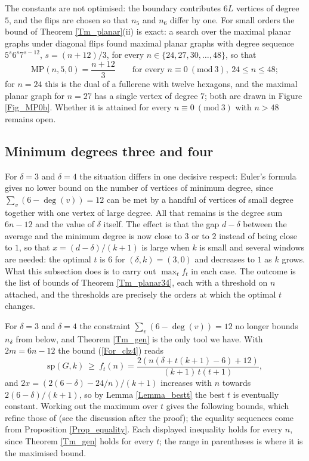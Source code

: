 \documentclass[10pt,a4paper]{article}
\begin{document}


The constants are not optimised: the boundary contributes $6L$ vertices of degree $5$, and the flips
are chosen so that $n_{5}$ and $n_{6}$ differ by one. For small orders the bound of Theorem
\ref{Tm_planar}(ii) is exact: a search over the maximal planar graphs under diagonal flips found
maximal planar graphs with degree sequence $5^{s}6^{s}7^{s-12}$, $s=(n+12)/3$, for every
$n\in \{24,27,30,\ldots ,48\}$, so that
\[
\mathrm{MP}(n,5,0)=\frac{n+12}{3}\qquad \text{for every }n\equiv 0\ (\mathrm{mod}\ 3),\ 24\leq n\leq 48;
\]
for $n=24$ this is the dual of a fullerene with twelve hexagons, and the maximal planar graph for $n=27$
has a single vertex of degree $7$; both are drawn in Figure \ref{Fig_MP0b}.
Whether it is
attained for every $n\equiv 0\ (\mathrm{mod}\ 3)$ with $n>48$ remains open.

\subsection{Minimum degrees three and four}
\label{Sec_planar34}

For $\delta =3$ and $\delta =4$ the situation differs in one decisive respect:
Euler's formula gives no lower bound on the number of vertices of minimum
degree, since $\sum_{v}(6-\deg (v))=12$ can be met by a handful of vertices of
small degree together with one vertex of large degree. All that remains is the
degree sum $6n-12$ and the value of $\delta $ itself. The effect is that the
gap $d-\delta $ between the average and the minimum degree is now close to $3$
or to $2$ instead of being close to $1$, so that $x=(d-\delta )/(k+1)$ is large
when $k$ is small and several windows are needed: the optimal $t$ is $6$ for
$(\delta ,k)=(3,0)$ and decreases to $1$ as $k$ grows. What this subsection
does is to carry out $\max_{t}f_{t}$ in each case. The outcome is the list of
bounds of Theorem \ref{Tm_planar34}, each with a threshold on $n$ attached, and
the thresholds are precisely the orders at which the optimal $t$ changes.



For $\delta =3$ and $\delta =4$ the constraint $\sum_{v}(6-\deg (v))=12$ no longer bounds
$n_{\delta }$ from below, and Theorem \ref{Tm_gen} is the only tool we have. With $2m=6n-12$ the
bound (\ref{For_clz4}) reads
\[
\mathrm{sp}(G,k)\ \geq \ f_{t}(n)=\frac{2\left( n(\delta +t(k+1)-6)+12\right) }{(k+1)\,t(t+1)},
\]
and $2x=\left( 2(6-\delta )-24/n\right) /(k+1)$ increases with $n$ towards $2(6-\delta )/(k+1)$, so by
Lemma \ref{Lemma_bestt} the best $t$ is eventually constant. Working out the maximum over $t$ gives
the following bounds, which refine those of \cite{CaroLauriZarb,CaroWest} (see the discussion after the
proof); the equality sequences come from Proposition \ref{Prop_equality}. Each displayed inequality
holds for every $n$, since Theorem \ref{Tm_gen} holds for every $t$; the range in parentheses is where
it is the maximised bound.
\end{document}
